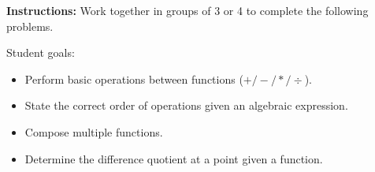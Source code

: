 




\noindent \textbf{Instructions:}  Work together in groups of  3 or 4 to complete the following problems.

Student goals:
  \begin{itemize}
  \item Perform basic operations between functions ($+/-/*/\div$).
  \item State the correct order of operations given an algebraic expression.
  \item Compose multiple  functions.
  \item Determine the difference quotient at a point given a function.
  \end{itemize}



